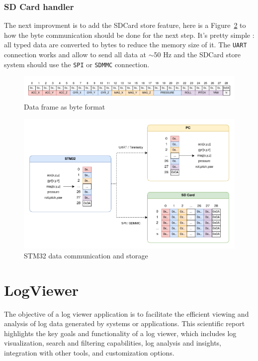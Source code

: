 
\subsubsection{SD Card handler}
The next improvment is to add the SDCard store feature, here is a Figure~\ref{fig:project_store} to how the byte communication should be done for the next step.
It's pretty simple : all typed data are converted to bytes to reduce the memory size of it. The \texttt{UART} connection works and allow to send all data at $\sim$50 Hz and the SDCard store system should use the \texttt{SPI} or \texttt{SDMMC} connection.
\begin{figure}[H]
    \centering
    \includegraphics[width=\linewidth]{./projects/pmodnav/frame_description.png}
    \caption{Data frame as byte format}
    \label{fig:frame_description}
\end{figure}

\begin{figure}[H]
    \centering
    \includegraphics[width=0.75\linewidth]{./projects/pmodnav/project_store.png}
    \caption{STM32 data communication and storage}
    \label{fig:project_store}
\end{figure}

\section{LogViewer}
The objective of a log viewer application is to facilitate the efficient viewing and analysis of log data generated by systems or applications.
This scientific report highlights the key goals and functionality of a log viewer, which includes log visualization, search and filtering capabilities, log analysis and insights, integration with other tools, and customization options.
